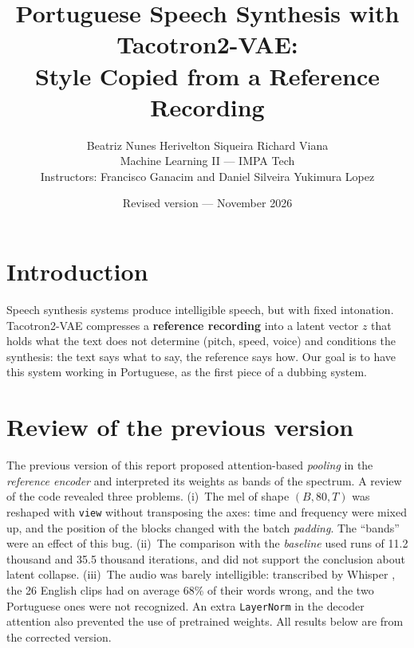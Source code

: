 \documentclass[twocolumn,a4paper,10pt]{article}
\title{\vspace{-1.2cm}\Large\textbf{Portuguese Speech Synthesis with Tacotron2-VAE:\\ Style Copied from a Reference Recording}}
\author{\normalsize Beatriz Nunes \quad Herivelton Siqueira \quad Richard Viana\\[2pt]
\small Machine Learning II --- IMPA Tech\\
\small Instructors: Francisco Ganacim and Daniel Silveira Yukimura Lopez}
\date{\small Revised version --- November 2026}
\begin{document}

\section{Introduction}
Speech synthesis systems produce intelligible speech, but with fixed intonation. Tacotron2-VAE \cite{hsu,zhang} compresses a \textbf{reference recording} into a latent vector $z$ that holds what the text does not determine (pitch, speed, voice) and conditions the synthesis: the text says what to say, the reference says how. Our goal is to have this system working in Portuguese, as the first piece of a dubbing system.

\section{Review of the previous version}
The previous version of this report proposed attention-based \textit{pooling} in the \textit{reference encoder} and interpreted its weights as bands of the spectrum. A review of the code revealed three problems. (i)~The mel of shape $(B, 80, T)$ was reshaped with \texttt{view} without transposing the axes: time and frequency were mixed up, and the position of the blocks changed with the batch \textit{padding}. The ``bands'' were an effect of this bug. (ii)~The comparison with the \textit{baseline} used runs of 11.2 thousand and 35.5 thousand iterations, and did not support the conclusion about latent collapse. (iii)~The audio was barely intelligible: transcribed by Whisper \cite{whisper}, the 26 English clips had on average 68\% of their words wrong, and the two Portuguese ones were not recognized. An extra \texttt{LayerNorm} in the decoder attention also prevented the use of pretrained weights. All results below are from the corrected version.
\end{document}
